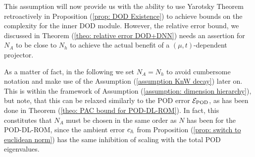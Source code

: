 This assumption will now provide us with the ability to use Yarotsky Theorem retroactively
in Proposition (\ref{prop: DOD Existence}) to achieve bounds on the complexity for the 
inner DOD module. However, 
the relative error bound, we discussed in Theorem (\ref{theo: relative error DOD+DNN})
needs an assertion for $N_A$ to be close to $N_h$ to achieve the actual benefit of a 
$(\mu, t)$-dependent projector.

As a matter of fact, in the following we set $N_A = N_h$ to avoid cumbersome notation and make
use of the Assumption (\ref{assumption KnW decay}) later on.
This is within the framework of Assumption (\ref{assumption: dimension hierarchy}), but 
note, that this can be relaxed similarly to the POD error $\mathcal{E}_\text{POD}$, as has been
done in Theorem (\ref{theo: PAC bound for POD-DL-ROM}). In fact, this constitutes that
$N_A$ must be chosen in the same order as $N$ has been for the POD-DL-ROM, since the ambient
error $c_{\mathbb{A}}$ from Proposition (\ref{prop: switch to euclidean norm}) has the same inhibition 
of scaling with the total POD eigenvalues. 

